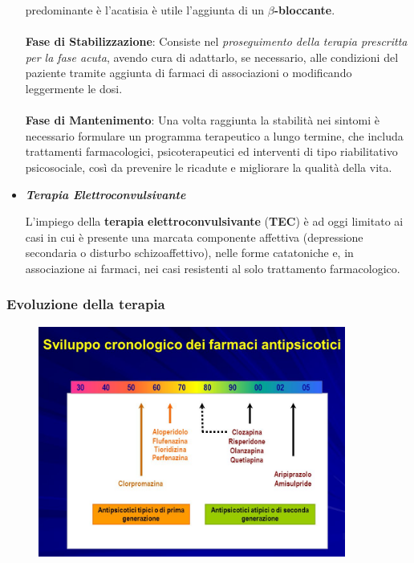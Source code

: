 \begin{itemize}
predominante è l'acatisia è utile l'aggiunta di un \textbf{$\beta$-bloccante}.
\\\\
\textbf{Fase di Stabilizzazione}: Consiste nel \emph{proseguimento della
terapia prescritta per la fase acuta}, avendo cura di adattarlo, se
necessario, alle condizioni del paziente tramite aggiunta di farmaci di
associazioni o modificando leggermente le dosi.
\\\\
\textbf{Fase di Mantenimento}: Una volta raggiunta la stabilità nei
sintomi è necessario formulare un programma terapeutico a lungo termine,
che includa trattamenti farmacologici, psicoterapeutici ed interventi di
tipo riabilitativo psicosociale, così da prevenire le ricadute e
migliorare la qualità della vita.

\item
  \textbf{\emph{Terapia Elettroconvulsivante}}

L'impiego della \textbf{terapia} \textbf{elettroconvulsivante}
(\textbf{TEC}) è ad oggi limitato ai casi in cui è presente una marcata
componente affettiva (depressione secondaria o disturbo
schizoaffettivo), nelle forme catatoniche e, in associazione ai farmaci,
nei casi resistenti al solo trattamento farmacologico.

\end{itemize}

\subsubsection{Evoluzione della terapia}

\begin{figure}[!ht]
\centering
	\includegraphics[width=0.9\textwidth]{07/image2.jpeg}
\end{figure}

